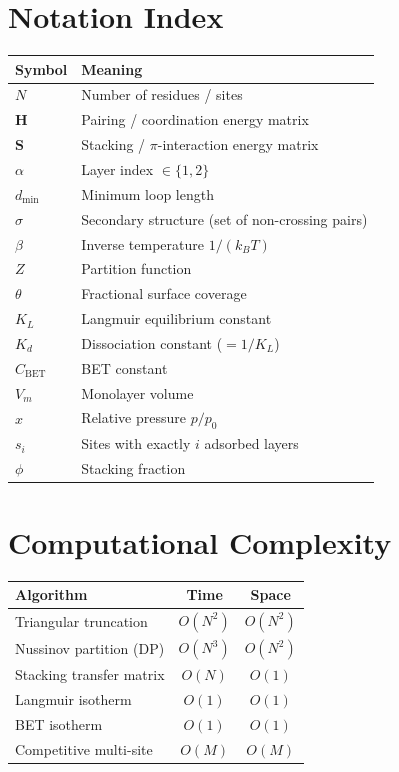 \documentclass[11pt]{article}
\begin{document}
\newpage
\appendix

\section{Notation Index}

\begin{center}
\begin{tabular}{lp{10cm}}
\toprule
\textbf{Symbol} & \textbf{Meaning} \\
\midrule
$N$            & Number of residues / sites \\
$\mathbf{H}$  & Pairing / coordination energy matrix \\
$\mathbf{S}$  & Stacking / $\pi$-interaction energy matrix \\
$\alpha$       & Layer index $\in \{1, 2\}$ \\
$d_{\min}$     & Minimum loop length \\
$\sigma$       & Secondary structure (set of non-crossing pairs) \\
$\beta$        & Inverse temperature $1/(k_B T)$ \\
$Z$            & Partition function \\
$\theta$       & Fractional surface coverage \\
$K_L$          & Langmuir equilibrium constant \\
$K_d$          & Dissociation constant ($= 1/K_L$) \\
$C_{\text{BET}}$ & BET constant \\
$V_m$          & Monolayer volume \\
$x$            & Relative pressure $p/p_0$ \\
$s_i$          & Sites with exactly $i$ adsorbed layers \\
$\phi$         & Stacking fraction \\
\bottomrule
\end{tabular}
\end{center}

\section{Computational Complexity}

\begin{center}
\begin{tabular}{lcc}
\toprule
\textbf{Algorithm} & \textbf{Time} & \textbf{Space} \\
\midrule
Triangular truncation    & $O(N^2)$     & $O(N^2)$ \\
Nussinov partition (DP)  & $O(N^3)$     & $O(N^2)$ \\
Stacking transfer matrix & $O(N)$       & $O(1)$   \\
Langmuir isotherm        & $O(1)$       & $O(1)$   \\
BET isotherm             & $O(1)$       & $O(1)$   \\
Competitive multi-site   & $O(M)$       & $O(M)$   \\
\bottomrule
\end{tabular}
\end{center}
\end{document}
